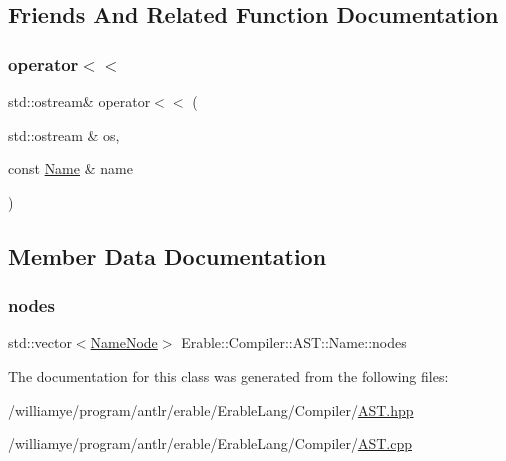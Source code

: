 \subsection{Friends And Related Function Documentation}
\mbox{\label{class_erable_1_1_compiler_1_1_a_s_t_1_1_name_a6aacec03a456bb828ba18f86f151078f}} 
\subsubsection{\texorpdfstring{operator$<$$<$}{operator<<}}
{\footnotesize\ttfamily std\+::ostream\& operator$<$$<$ (\begin{DoxyParamCaption}\item[{std\+::ostream \&}]{os,  }\item[{const \mbox{\hyperlink{class_erable_1_1_compiler_1_1_a_s_t_1_1_name}{Name}} \&}]{name }\end{DoxyParamCaption})\hspace{0.3cm}{\ttfamily [friend]}}



\subsection{Member Data Documentation}
\mbox{\label{class_erable_1_1_compiler_1_1_a_s_t_1_1_name_ad0f349d658f7d1300785b37fac094305}} 
\subsubsection{\texorpdfstring{nodes}{nodes}}
{\footnotesize\ttfamily std\+::vector$<$\mbox{\hyperlink{struct_erable_1_1_compiler_1_1_a_s_t_1_1_name_node}{Name\+Node}}$>$ Erable\+::\+Compiler\+::\+A\+S\+T\+::\+Name\+::nodes\hspace{0.3cm}{\ttfamily [private]}}



The documentation for this class was generated from the following files\+:\begin{DoxyCompactItemize}
\item 
/williamye/program/antlr/erable/\+Erable\+Lang/\+Compiler/\mbox{\hyperlink{_a_s_t_8hpp}{A\+S\+T.\+hpp}}\item 
/williamye/program/antlr/erable/\+Erable\+Lang/\+Compiler/\mbox{\hyperlink{_a_s_t_8cpp}{A\+S\+T.\+cpp}}\end{DoxyCompactItemize}
